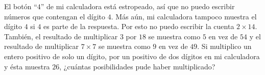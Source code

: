 El botón “$4$” de mi calculadora está estropeado, así que no puedo escribir números que contengan el dígito $4$. Más aún, mi calculadora tampoco muestra el dígito $4$ si $4$ es parte de la respuesta. Por esto no puedo escribir la cuenta $2 \times 14$. También, el resultado de multiplicar $3$ por $18$ se muestra como $5$ en vez de $54$ y el resultado de multiplicar $7 \times 7$ se muestra como $9$ en vez de $49$. Si multiplico un entero positivo de solo un dígito, por un positivo de dos dígitos en mi calculadora y ésta muestra $26$, ¿cuántas posibilidades pude haber multiplicado?